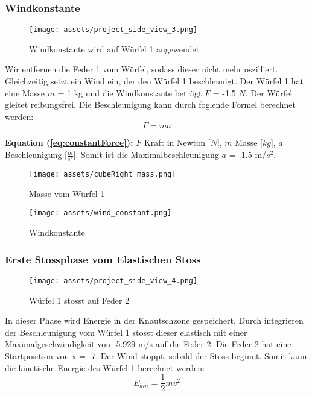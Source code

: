 \documentclass{article}
\begin{document}
\subsubsection{Windkonstante}
\begin{figure}[H] 
\centering\texttt{[image: assets/project\_side\_view\_3.png]}
\scriptsize
\caption{Windkonstante wird auf Würfel 1 angewendet}
\label{fig:project_side_view_3}
\end{figure}
Wir entfernen die Feder 1 vom Würfel, sodass dieser nicht mehr oszilliert. Gleichzeitig setzt ein Wind ein, der den
Würfel 1 beschleunigt. Der Würfel 1 hat eine Masse $m$ = 1 kg und die Windkonstante beträgt $F$ = -1.5 $N$. Der Würfel gleitet reibungsfrei.
Die Beschleunigung kann durch foglende Formel berechnet werden:
\begin{equation}\label{eq:constantForce}
    F = m  a
\end{equation}

\scriptsize
\textbf{Equation (\ref{eq:constantForce}):} $F$ Kraft in Newton [$N$], $m$ Masse [$kg$], $a$ Beschleunigung 
[$\frac{m}{s^2}$].
\normalsize
\medskip
\newline
Somit ist die Maximalbeschleunigung $a$ = -1.5 m/\( s^2 \).

\begin{figure}[H] 
\centering\texttt{[image: assets/cubeRight\_mass.png]}
\scriptsize
\caption{Masse vom Würfel 1}
\label{fig:cubeRight_mass}
\end{figure}

\begin{figure}[H] 
\centering\texttt{[image: assets/wind\_constant.png]}
\scriptsize
\caption{Windkonstante}
\label{fig:wind_constant}
\end{figure}
\newpage

\subsubsection{Erste Stossphase vom Elastischen Stoss}
\begin{figure}[H] 
\centering\texttt{[image: assets/project\_side\_view\_4.png]}
\scriptsize
\caption{Würfel 1 stosst auf Feder 2}
\label{fig:project_side_view_4}
\end{figure}
In dieser Phase wird Energie in der Knautschzone gespeichert. Durch integrieren der Beschleunigung vom Würfel 1 stosst dieser elastisch mit einer Maximalgeschwindigkeit von -5.929 m/s auf die Feder 2. Die Feder 2 hat eine Startposition von x = -7. Der Wind stoppt, sobald der Stoss beginnt.
Somit kann die kinetische Energie des Würfel 1 berechnet werden:
\begin{equation}\label{eq:kinEnergie}
E_{kin} = \frac{1}{2} mv^2
\end{equation}
\end{document}
